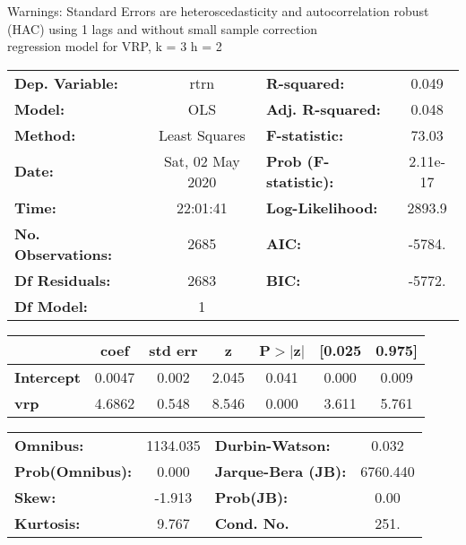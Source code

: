 Warnings: \newline
 [1] Standard Errors are heteroscedasticity and autocorrelation robust (HAC) using 1 lags and without small sample correction\\ 

regression model for VRP, k = 3 h = 2\begin{center}
\begin{tabular}{lclc}
\toprule
\textbf{Dep. Variable:}    &       rtrn       & \textbf{  R-squared:         } &     0.049   \\
\textbf{Model:}            &       OLS        & \textbf{  Adj. R-squared:    } &     0.048   \\
\textbf{Method:}           &  Least Squares   & \textbf{  F-statistic:       } &     73.03   \\
\textbf{Date:}             & Sat, 02 May 2020 & \textbf{  Prob (F-statistic):} &  2.11e-17   \\
\textbf{Time:}             &     22:01:41     & \textbf{  Log-Likelihood:    } &    2893.9   \\
\textbf{No. Observations:} &        2685      & \textbf{  AIC:               } &    -5784.   \\
\textbf{Df Residuals:}     &        2683      & \textbf{  BIC:               } &    -5772.   \\
\textbf{Df Model:}         &           1      & \textbf{                     } &             \\
\bottomrule
\end{tabular}
\begin{tabular}{lcccccc}
                   & \textbf{coef} & \textbf{std err} & \textbf{z} & \textbf{P$> |$z$|$} & \textbf{[0.025} & \textbf{0.975]}  \\
\midrule
\textbf{Intercept} &       0.0047  &        0.002     &     2.045  &         0.041        &        0.000    &        0.009     \\
\textbf{vrp}       &       4.6862  &        0.548     &     8.546  &         0.000        &        3.611    &        5.761     \\
\bottomrule
\end{tabular}
\begin{tabular}{lclc}
\textbf{Omnibus:}       & 1134.035 & \textbf{  Durbin-Watson:     } &    0.032  \\
\textbf{Prob(Omnibus):} &   0.000  & \textbf{  Jarque-Bera (JB):  } & 6760.440  \\
\textbf{Skew:}          &  -1.913  & \textbf{  Prob(JB):          } &     0.00  \\
\textbf{Kurtosis:}      &   9.767  & \textbf{  Cond. No.          } &     251.  \\
\bottomrule
\end{tabular}
\end{center}


